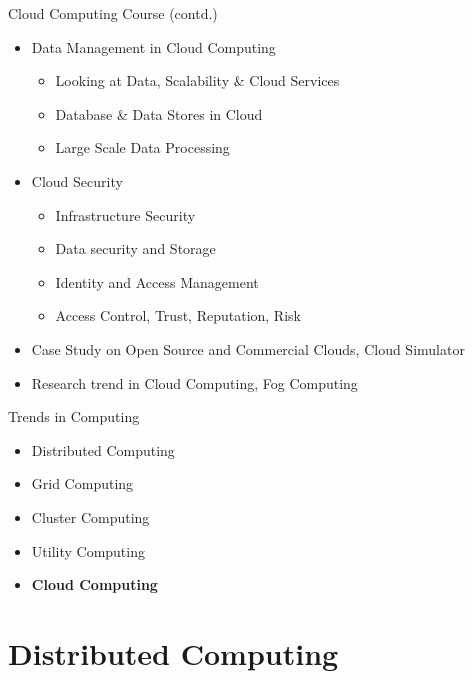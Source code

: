 \documentclass{SKP-beamer}
\begin{document}
\begin{frame}{Cloud Computing Course (contd.)}
	\begin{itemize}
		\item  Data Management in Cloud Computing
		\begin{itemize}
			\item  Looking at Data, Scalability \& Cloud Services
			\item Database \& Data Stores in Cloud
			\item Large Scale Data Processing
		\end{itemize}
		\item Cloud Security
		\begin{itemize}
			\item Infrastructure Security
			\item Data security and Storage
			\item Identity and Access Management
			\item Access Control, Trust, Reputation, Risk
		\end{itemize}
		\item Case Study on Open Source and Commercial Clouds, Cloud Simulator
		\item Research trend in Cloud Computing, Fog Computing
		
		
	\end{itemize}	
\end{frame}





\begin{frame}{Trends in Computing}
		\begin{itemize}
		\item Distributed Computing
		\item Grid Computing
		\item Cluster Computing
		\item Utility Computing
		\item \textbf{Cloud Computing}
		
	\end{itemize}
\end{frame}

\section{Distributed Computing}
\end{document}
